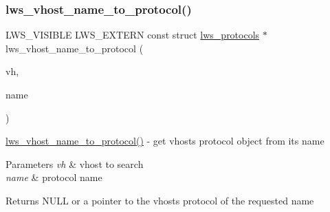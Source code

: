 \subsubsection{\texorpdfstring{lws\+\_\+vhost\+\_\+name\+\_\+to\+\_\+protocol()}{lws\_vhost\_name\_to\_protocol()}}
{\footnotesize\ttfamily L\+W\+S\+\_\+\+V\+I\+S\+I\+B\+LE L\+W\+S\+\_\+\+E\+X\+T\+E\+RN const struct \hyperlink{structlws__protocols}{lws\+\_\+protocols} $\ast$ lws\+\_\+vhost\+\_\+name\+\_\+to\+\_\+protocol (\begin{DoxyParamCaption}\item[{struct lws\+\_\+vhost $\ast$}]{vh,  }\item[{const char $\ast$}]{name }\end{DoxyParamCaption})}

\hyperlink{group__Protocols-and-Plugins_ga2a4e5ce5e4492f77e892935397de5303}{lws\+\_\+vhost\+\_\+name\+\_\+to\+\_\+protocol()} -\/ get vhost\textquotesingle{}s protocol object from its name


\begin{DoxyParams}{Parameters}
{\em vh} & vhost to search \\
\hline
{\em name} & protocol name\\
\hline
\end{DoxyParams}
Returns N\+U\+LL or a pointer to the vhost\textquotesingle{}s protocol of the requested name 